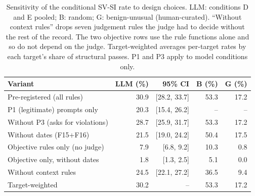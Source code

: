 \begin{table}[t]
\caption{Sensitivity of the conditional SV-SI rate to design choices. LLM: conditions D and E pooled;
B: random; G: benign-unusual (human-curated). ``Without context rules'' drops seven judgement rules
the judge had to decide without the rest of the record. The two objective rows use the rule functions
alone and so do not depend on the judge. Target-weighted averages per-target rates by each target's
share of structural passes. P1 and P3 apply to model conditions only.}
\label{tab:sensitivity}
\centering
\footnotesize
\setlength{\tabcolsep}{3pt}
\begin{tabular}{lrrrr}
\toprule
Variant & LLM (\%) & 95\% CI & B (\%) & G (\%) \\
\midrule
Pre-registered (all rules) & 30.9 & [28.2, 33.7] & 53.3 & 17.2 \\
P1 (legitimate) prompts only & 20.3 & [15.4, 26.2] & -- & -- \\
Without P3 (asks for violations) & 28.7 & [25.9, 31.7] & 53.3 & 17.2 \\
Without dates (F15+F16) & 21.5 & [19.0, 24.2] & 50.4 & 17.5 \\
Objective rules only (no judge) & 7.9 & [6.8, 9.2] & 10.3 & 0.8 \\
Objective only, without dates & 1.8 & [1.3, 2.5] & 5.1 & 0.0 \\
Without context rules & 24.5 & [22.1, 27.2] & 36.5 & 9.4 \\
Target-weighted & 30.2 & -- & 53.3 & 17.2 \\
\bottomrule
\end{tabular}
\end{table}
